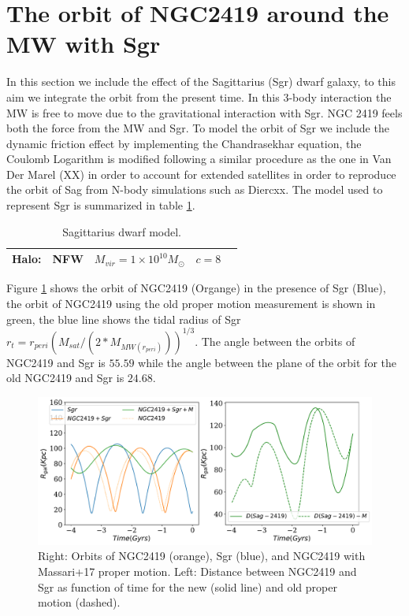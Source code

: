 \documentclass[14pt]{article}
\begin{document}
\section{The orbit of NGC2419 around the MW with Sgr}

In this section we include the effect of the Sagittarius (Sgr) dwarf
galaxy, to this aim we integrate the orbit from the present time. In
this 3-body interaction the MW is free to move due to the
gravitational interaction with Sgr. NGC 2419 feels both the force
from the MW and Sgr. To model the orbit of Sgr we include the dynamic
friction effect by implementing the Chandrasekhar equation, the
Coulomb Logarithm is modified following a similar procedure as the one
in Van Der Marel (XX) in order to account for extended satellites in 
order to reproduce the orbit of Sag from N-body simulations such as 
Diercxx. The model used to represent Sgr is summarized in table
\ref{tab:Sgrmodel}.


\begin{table}[H]
\centering
\begin{tabular}{c c c c c}
\hline
\hline
Halo: & NFW & $M_{vir} = 1\times 10^{10} M_{\odot}$ & $c=8$  \\
\hline
\hline
\end{tabular}
\caption{Sagittarius dwarf model.\label{tab:Sgrmodel}}
\end{table}


Figure \ref{fig:Sgrmodel1} shows the orbit of NGC2419 (Organge) in the
presence of Sgr (Blue), the orbit of NGC2419 using the old proper
motion measurement is shown in green, the blue line shows the tidal
radius of Sgr $r_t = r_{peri} (M_{sat}/(2*M_{MW(r_{peri})}))^{1/3}$.
The angle between the orbits of NGC2419 and Sgr is $55.59$ while the
angle between the plane of the orbit for the old NGC2419  and Sgr is
$24.68$.

\begin{figure}[H]
\centering
\includegraphics[scale=0.5]{../exploratory_code/NGC2419_sphMWSGR.pdf}
\caption{Right: Orbits of NGC2419 (orange), Sgr (blue), and NGC2419
with Massari+17 proper motion. Left: Distance between NGC2419 and Sgr
as function of time for the new (solid line) and old proper motion
(dashed). \label{fig:Sgrmodel1}}
\end{figure}
\end{document}
